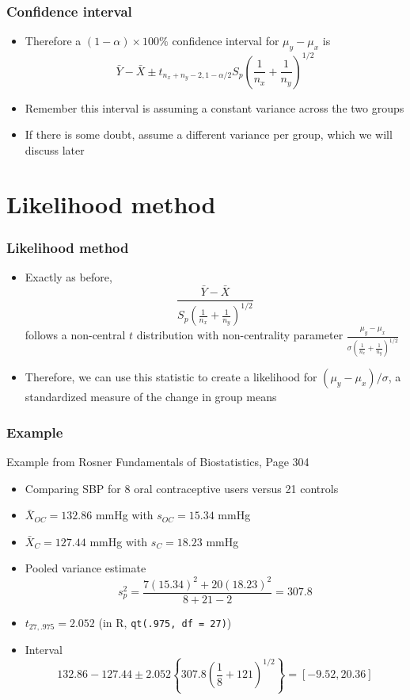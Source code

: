 \documentclass[aspectratio=169]{beamer}
\begin{document}
\begin{frame}\frametitle{Confidence interval}
  \begin{itemize}
  \item Therefore a $(1 - \alpha)\times 100\%$ confidence interval for
    $\mu_y - \mu_x$ is 
    $$
    \bar Y - \bar X \pm t_{n_x + n_y - 2, 1 - \alpha/2}S_p\left(\frac{1}{n_x} + \frac{1}{n_y}\right)^{1/2}
    $$
  \item Remember this interval is assuming a constant variance across the
    two groups
  \item If there is some doubt, assume a different variance per group, which
    we will discuss later
  \end{itemize}
\end{frame}

\section{Likelihood method}
\begin{frame}\frametitle{Likelihood method}
  \begin{itemize}
  \item Exactly as before, 
    $$
    \frac{\bar Y - \bar X}{S_p \left(\frac{1}{n_x} + \frac{1}{n_y}\right)^{1/2}}
    $$
    follows a non-central $t$ distribution with non-centrality parameter
    $\frac{\mu_y - \mu_x}{\sigma  \left(\frac{1}{n_x} + \frac{1}{n_y}\right)^{1/2}}$
  \item Therefore, we can use this statistic to create a likelihood for
    $(\mu_y - \mu_x) / \sigma$, a standardized measure of the change in
    group means
  \end{itemize}
\end{frame}

\begin{frame}\frametitle{Example}
Example from Rosner Fundamentals of Biostatistics, Page 304
\begin{itemize}
\item Comparing SBP for 8 oral contraceptive users versus 21 controls
\item $\bar X_{OC} = 132.86$ mmHg with $s_{OC} = 15.34$ mmHg
\item $\bar X_{C} = 127.44$ mmHg with $s_{C} = 18.23$ mmHg
\item Pooled variance estimate
$$
s_p^2 = \frac{7 (15.34)^2 + 20 (18.23)^2}{8 + 21 - 2} = 307.8
$$ 
\item $t_{27,.975} = 2.052$ (in R, \texttt{qt(.975, df = 27)})
\item Interval
$$
132.86 - 127.44 \pm 2.052 \left\{307.8 \left( \frac{1}{8} + {1}{21}\right)^{1/2} \right\}
= [-9.52, 20.36]
$$
\end{itemize}
\end{frame}
\end{document}
